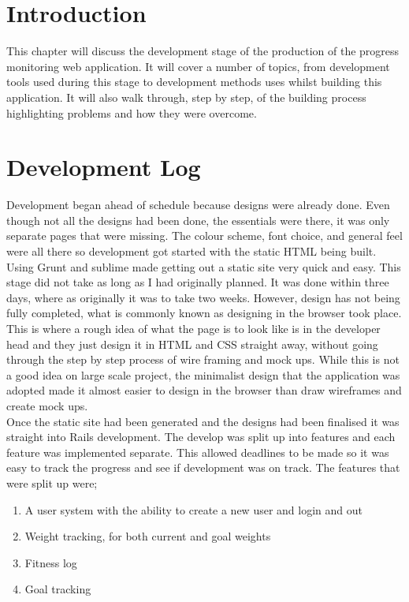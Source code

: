 \section{Introduction}
This chapter will discuss the development stage of the production of the progress monitoring web application. It will cover a number of topics, from development tools used during this stage to development methods uses whilst building this application. It will also walk through, step by step, of the building process highlighting problems and how they were overcome.\\



\section{Development Log}
Development began ahead of schedule because designs were already done. Even though not all the designs had been done, the essentials were there, it was only separate pages that were missing. The colour scheme, font choice, and general feel were all there so development got started with the static HTML being built. Using Grunt \citep{grunt:2013} and sublime made getting out a static site very quick and easy. This stage did not take as long as I had originally planned. It was done within three days, where as originally it was to take two weeks. However, design has not being fully completed, what is commonly known as designing in the browser took place. This is where a rough idea of what the page is to look like is in the developer head and they just design it in HTML and CSS straight away, without going through the step by step process of wire framing and mock ups. While this is not a good idea on large scale project, the minimalist design that the application was adopted made it almost easier to design in the browser than draw wireframes and create mock ups.\\

Once the static site had been generated and the designs had been finalised it was straight into Rails development. The develop was split up into features and each feature was implemented separate. This allowed deadlines to be made so it was easy to track the progress and see if development was on track. The features that were split up were;

\begin{enumerate}
\item A user system with the ability to create a new user and login and out
\item Weight tracking, for both current and goal weights
\item Fitness log
\item Goal tracking
\end{enumerate}


